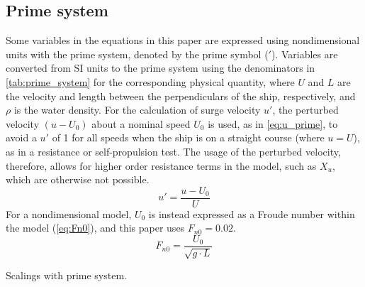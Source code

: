 \subsection{Prime system} \label{sec:prime_system}
Some variables in the equations in this paper are expressed using nondimensional units with the prime system, denoted by the prime symbol ($'$). Variables are converted from SI units to the prime system using the denominators in \autoref{tab:prime_system} for the corresponding physical quantity, where $U$ and $L$ are the velocity and length between the perpendiculars of the ship, respectively, and $\rho$ is the water density.
For the calculation of surge velocity $u'$, the perturbed velocity $(u-U_0)$ about a nominal speed $U_0$ is used, as in \autoref{eq:u_prime}, to avoid a $u'$ of 1 for all speeds when the ship is on a straight course (where $u=U$), as in a resistance or self-propulsion test. The usage of the perturbed velocity, therefore, allows for higher order resistance terms in the model, such as $X_{u}$, which are otherwise not possible. 
\begin{equation}
    \label{eq:u_prime}
    u' = \frac{u-U_0}{U}
\end{equation}
For a nondimensional model, $U_0$ is instead expressed as a Froude number within the model (\autoref{eq:Fn0}), and this paper uses $F_{n0}=0.02$.
\begin{equation}
    \label{eq:Fn0}
    F_{n0} = \frac{U_0}{\sqrt{g \cdot L}}
\end{equation}
\begin{table}[h]
    \centering
    \caption{Scalings with prime system.}
    \label{tab:prime_system}
\end{table}